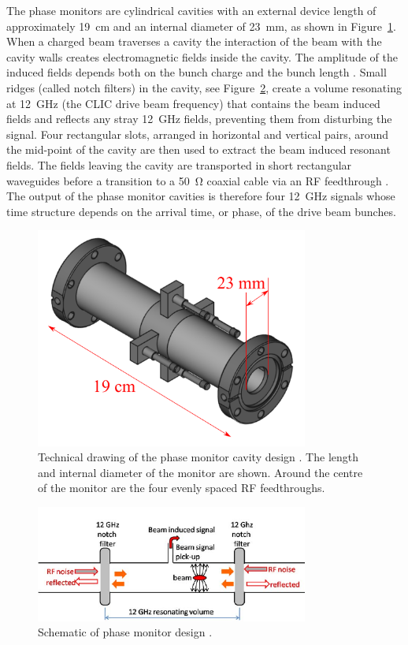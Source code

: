 The phase monitors are cylindrical cavities with an external device length of approximately 19~cm and an internal diameter of 23~mm, as shown in Figure~\ref{f:phMonTechDraw}. When a charged beam traverses a cavity the interaction of the beam with the cavity walls creates electromagnetic fields inside the cavity. The amplitude of the induced fields depends both on the bunch charge and the bunch length \cite{alexPFFWP}. Small ridges (called notch filters) in the cavity, see Figure~\ref{f:notchFilters}, create a volume resonating at 12~GHz (the CLIC drive beam frequency) that contains the beam induced fields and reflects any stray 12~GHz fields, preventing them from disturbing the signal. Four rectangular slots, arranged in horizontal and vertical pairs, around the mid-point of the cavity are then used to extract the beam induced resonant fields. The fields leaving the cavity are transported in short rectangular waveguides before a transition to a 50~\(\mathrm{\Omega}\) coaxial cable via an RF feedthrough \cite{phMonIPAC10}. The output of the phase monitor cavities is therefore four 12~GHz signals whose time structure depends on the arrival time, or phase, of the drive beam bunches.

\begin{figure}
  \centering
  \includegraphics[width=0.8\textwidth]{Figures/phaseMons/phMonTechDraw}
  \caption{Technical drawing of the phase monitor cavity design \cite{phMonTechDraw}. The length and internal diameter of the monitor are shown. Around the centre of the monitor are the four evenly spaced RF feedthroughs.}
  \label{f:phMonTechDraw}
\end{figure}

\begin{figure}
  \centering
  \includegraphics[width=0.8\textwidth]{Figures/phaseMons/notchFilters}
  \caption{Schematic of phase monitor design \cite{phMonEuCard}.}
  \label{f:notchFilters}
\end{figure}


